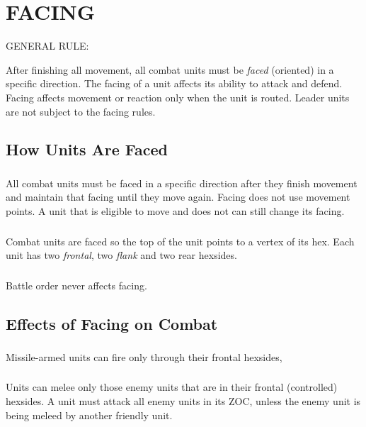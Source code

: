 \section{FACING}
\hfill

GENERAL RULE:

After finishing all movement, all combat units must be \textit{faced} (oriented) in a specific direction. The facing of a unit affects its ability to attack and defend. Facing affects movement or reaction only when the unit is routed. Leader units are not subject to the facing rules.

\subsection{How Units Are Faced}

\subsubsection[Facing Direction]{} All combat units must be faced in a specific direction after they finish movement and maintain that facing until they move again. Facing does not use movement points. A unit that is eligible to move and does not can still change its facing.

\subsubsection[Combat Units]{} Combat units are faced so the top of the unit points to a vertex of its hex. Each unit has two \textit{frontal}, two \textit{flank} and two {rear} hexsides.

\subsubsection[Battle Order]{} Battle order never affects facing.

\subsection{Effects of Facing on Combat}

\subsubsection[Missile Armed Troops]{} Missile-armed units can fire only through their frontal hexsides,

\subsubsection[Melee]{} Units can melee only those enemy units that are in their frontal (controlled) hexsides. A unit must attack all enemy units in its ZOC, unless the enemy unit is being meleed by another friendly unit.

